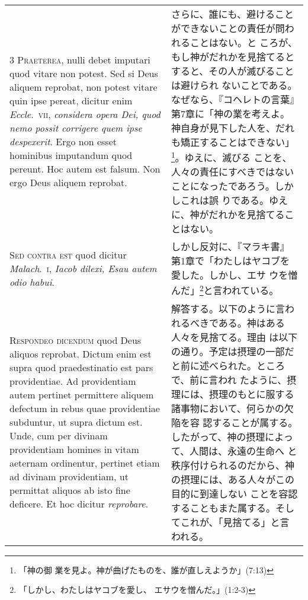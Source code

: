 \documentclass[10pt]{jsarticle} %
\begin{document}
\begin{longtable}{p{21em}p{21em}}
 

\\


{\scshape  3 Praeterea}, nulli debet imputari quod vitare
non potest. Sed si Deus aliquem reprobat, non potest vitare quin ipse
pereat, dicitur enim {\itshape Eccle}.~{\scshape vii}, {\itshape considera opera Dei, quod nemo possit
corrigere quem ipse despexerit}. Ergo non esset hominibus imputandum quod
pereunt. Hoc autem est falsum. Non ergo Deus aliquem reprobat.


&

さらに、誰にも、避けることができないことの責任が問われることはない。と
ころが、もし神がだれかを見捨てるとすると、その人が滅びることは避けられ
ないことである。なぜなら、『コヘレトの言葉』第7章に「神の業を考えよ。
神自身が見下した人を、だれも矯正することはできない」\footnote{「神の御
業を見よ。神が曲げたものを、誰が直しえようか」(7:13)}。ゆえに、滅びる
ことを、人々の責任にすべきではないことになったであろう。しかしこれは誤
りである。ゆえに、神がだれかを見捨てることはない。
 

\\


{\scshape Sed contra est} quod dicitur {\itshape Malach}.~{\scshape i},
 {\itshape Iacob dilexi, Esau autem odio habui}.


&

 しかし反対に、『マラキ書』第1章で「わたしはヤコブを愛した。しかし、エサ
 ウを憎んだ」\footnote{「しかし、わたしはヤコブを愛し、
 エサウを憎んだ。」(1:2-3)}と言われている。

\\


{\scshape Respondeo dicendum} quod Deus aliquos
reprobat. Dictum enim est supra quod praedestinatio est pars
providentiae. Ad providentiam autem pertinet permittere aliquem defectum
in rebus quae providentiae subduntur, ut supra dictum est. Unde, cum per
divinam providentiam homines in vitam aeternam ordinentur, pertinet
etiam ad divinam providentiam, ut permittat aliquos ab isto fine
 deficere. Et hoc dicitur {\itshape reprobare}.

 &

解答する。以下のように言われるべきである。神はある人々を見捨てる。理由
は以下の通り。予定は摂理の一部だと前に述べられた。ところで、前に言われ
たように、摂理には、摂理のもとに服する諸事物において、何らかの欠陥を容
認することが属する。したがって、神の摂理によって、人間は、永遠の生命へ
と秩序付けられるのだから、神の摂理には、ある人々がこの目的に到達しない
ことを容認することもまた属する。そしてこれが、「見捨てる」と言われる。


\end{longtable}
\end{document}
